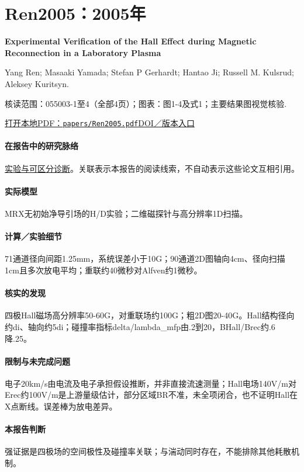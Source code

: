 \documentclass[UTF8,a4paper,11pt,openany,fontset=fandol]{ctexbook}
\begin{document}
\section{Ren2005：2005年}\label{paper:Ren2005}

\textbf{Experimental Verification of the Hall Effect during Magnetic Reconnection in a Laboratory Plasma}\citep{Ren2005}\

Yang Ren;  Masaaki Yamada;  Stefan P Gerhardt;  Hantao Ji;  Russell M. Kulsrud;  Aleksey Kuritsyn.

\textsf{核读范围：}055003-1至4（全部4页）；\textsf{图表：}图1-4及式1；主要结果图视觉核验.

\href{run:../papers/Ren2005.pdf}{打开本地PDF：\texttt{papers/Ren2005.pdf}}\quad\href{https://doi.org/10.1103/physrevlett.95.055003}{DOI／版本入口}

\paragraph{在报告中的研究脉络}\hyperref[story:diagnostic]{实验与可区分诊断}。关联表示本报告的阅读线索，不自动表示这些论文互相引用。

\paragraph{实际模型}MRX无初始净导引场的H/D实验；二维磁探针与高分辨率1D扫描。

\paragraph{计算／实验细节}71通道径向间距1.25mm，系统误差小于10G；90通道2D图轴向4cm、径向扫描1cm且多次放电平均；重联约40微秒对Alfven约1微秒。

\paragraph{核实的发现}四极Hall磁场高分辨率50-60G，对重联场约100G；粗2D图20-40G。Hall结构径向约di、轴向约5di；碰撞率指标delta/lambda\_mfp由.2到20，BHall/Brec约.6降.25。

\paragraph{限制与未完成问题}电子20km/s由电流及电子承担假设推断，并非直接流速测量；Hall电场140V/m对Erec约100V/m是上游量级估计，部分区域BR不准，未全项闭合，也不证明Hall在X点断线。误差棒为放电差异。

\paragraph{本报告判断}强证据是四极场的空间极性及碰撞率关联；与湍动同时存在，不能排除其他耗散机制。
\end{document}
